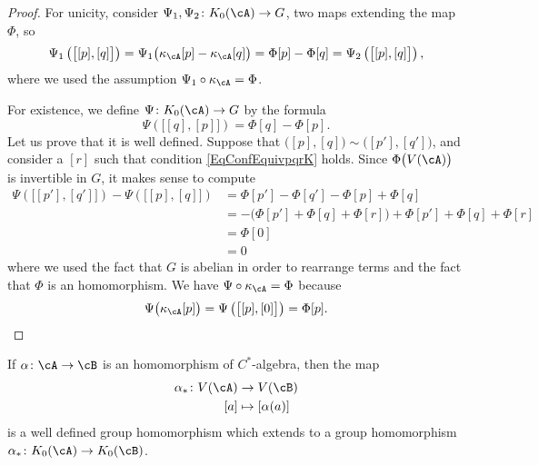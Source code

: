 \begin{proof}
For unicity, consider $\Psi_1,\Psi_2\colon K_0(\cA)\to G$, two maps extending the map $\Phi$, so
\begin{equation}
\Psi_1\left( \big[ [p],[q] \big] \right)=\Psi_1\big( \kappa_{\cA}[p]-\kappa_{\cA}[q] \big)= \Phi[p]-\Phi[q]=\Psi_2\left( \big[ [p],[q] \big] \right),
\end{equation}
where we used the assumption $\Psi_1\circ\kappa_{\cA}=\Phi$.

For existence, we define $\Psi\colon K_0(\cA)\to G$ by the formula
\begin{equation}
	\Psi\left( \big[ [q],[p] \big] \right)=\Phi[q]-\Phi[p].
\end{equation}
Let us prove that it is well defined. Suppose that $\big( [p],[q] \big)\sim \big( [p'],[q'] \big)$, and consider a $[r]$ such that condition \eqref{EqConfEquivpqrK} holds. Since $\Phi\big( V(\cA) \big)$ is invertible in $G$, it makes sense to compute
\begin{equation}
\begin{split}
\Psi\left( \big[ [p'],[q'] \big] \right)-\Psi\left( \big[ [p],[q] \big] \right)&=\Phi[p']-\Phi[q']-\Phi[p]+\Phi[q]\\
			&=-\big( \Phi[p']+\Phi[q]+\Phi[r] \big)+\Phi[p']+\Phi[q]+\Phi[r]\\
			&=\Phi[0]\\
			&=0
\end{split}
\end{equation}
where we used the fact that $G$ is abelian in order to rearrange terms and the fact that $\Phi$ is an homomorphism. We have $\Psi\circ\kappa_{\cA}=\Phi$ because
\[
  \Psi\big( \kappa_{\cA}[p] \big)=\Psi\left( \big[ [p],[0] \big] \right)=\Phi[p].
\]
\end{proof}

\begin{proposition}
If $\alpha\colon \cA\to \cB$ is an homomorphism of $C^*$-algebra, then the map
\begin{equation}
\begin{aligned}
 \alpha_*\colon V(\cA)&\to V(\cB) \\
   [a]&\mapsto [\alpha(a)]
\end{aligned}
\end{equation}
is a well defined group homomorphism which extends to a group homomorphism $\alpha_*\colon K_0(\cA)\to K_0(\cB)$.
\end{proposition}

